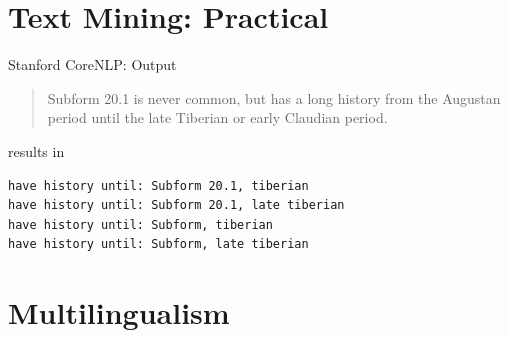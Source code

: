 \documentclass[xcolor=x11names, aspectratio=169,usenames,dvipsnames]{beamer}
\begin{document}
\section{Text Mining: Practical}

\begin{frame}[fragile]{Stanford CoreNLP: Output}
\begin{quote}
Subform 20.1 is never common, but has a long history from the Augustan period until the late Tiberian or early Claudian period.
\end{quote}
results in
\begin{verbatim}
have history until: Subform 20.1, tiberian
have history until: Subform 20.1, late tiberian
have history until: Subform, tiberian
have history until: Subform, late tiberian
\end{verbatim}
\end{frame}

\section{Multilingualism}

\maketitle
\end{document}
